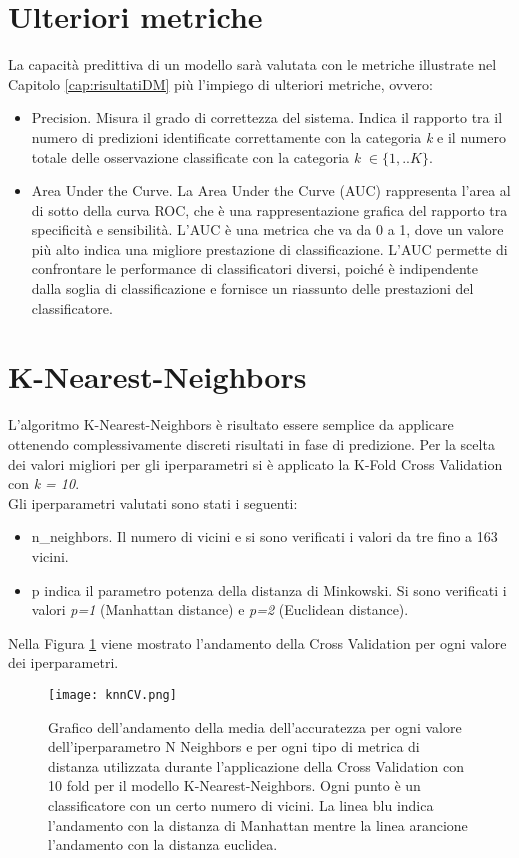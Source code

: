 \section{Ulteriori metriche}
La capacità predittiva di un modello sarà valutata con le metriche illustrate nel Capitolo \ref{cap:risultatiDM} più l'impiego di ulteriori metriche, ovvero:
\begin{itemize}
	\item \textsf{Precision}. Misura il grado di correttezza del sistema. Indica il rapporto tra il numero di predizioni identificate correttamente con la categoria \emph{k} e il numero totale delle osservazione classificate con la categoria \emph{k} $\in \{1,..K\}$.
	\item \textsf{Area Under the Curve}. La Area Under the Curve (AUC) rappresenta l'area al di sotto della curva ROC, che è una rappresentazione grafica del rapporto tra specificità e sensibilità.
	L'AUC è una metrica che va da 0 a 1, dove un valore più alto indica una migliore prestazione di classificazione. L'AUC permette di confrontare le performance di classificatori diversi, poiché è indipendente dalla soglia di classificazione e fornisce un riassunto delle prestazioni del classificatore.
\end{itemize}

\section{K-Nearest-Neighbors}
L'algoritmo K-Nearest-Neighbors è risultato essere semplice da applicare ottenendo complessivamente discreti risultati in fase di predizione. Per la scelta dei valori migliori per gli iperparametri si è applicato la K-Fold Cross Validation con \emph{k = 10}.\\
Gli iperparametri valutati sono stati i seguenti:
\begin{itemize}
	\item \textsf{n\_neighbors}. Il numero di vicini e si sono verificati i valori da tre fino a 163 vicini.
	\item \textsf{p} indica il parametro potenza della distanza di Minkowski. Si sono verificati i valori \emph{p=1} (Manhattan distance) e \emph{p=2} (Euclidean distance).
\end{itemize}

Nella Figura \ref{fig:knnCV} viene mostrato l'andamento della Cross Validation per ogni valore dei iperparametri.
\begin{figure}[h]
	\begin{center}
		\texttt{[image: knnCV.png]}
		\caption{Grafico dell'andamento della media dell'accuratezza per ogni valore dell'iperparametro N Neighbors e per ogni tipo di metrica di distanza utilizzata durante l'applicazione della Cross Validation con 10 fold per il modello K-Nearest-Neighbors. Ogni punto è un classificatore con un certo numero di vicini. La linea blu indica l'andamento con la distanza di Manhattan mentre la linea arancione l'andamento con la distanza euclidea.
		} 
		\label{fig:knnCV}
	\end{center}
\end{figure}

